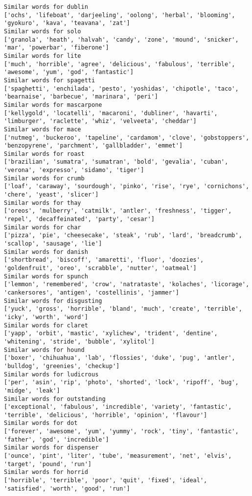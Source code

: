 \documentclass[11pt]{article}
\begin{document}
\begin{Verbatim}[commandchars=\\\{\}]
Similar words for dublin
['ochs', 'lifeboat', 'darjeeling', 'oolong', 'herbal', 'blooming', 'gyokuro', 'kava', 'teavana', 'zat']
Similar words for solo
['granola', 'heath', 'halvah', 'candy', 'zone', 'mound', 'snicker', 'mar', 'powerbar', 'fiberone']
Similar words for lite
['much', 'horrible', 'agree', 'delicious', 'fabulous', 'terrible', 'awesome', 'yum', 'god', 'fantastic']
Similar words for spagetti
['spaghetti', 'enchilada', 'pesto', 'yoshidas', 'chipotle', 'taco', 'bearnaise', 'barbecue', 'marinara', 'peri']
Similar words for mascarpone
['kellygold', 'locatelli', 'macaroni', 'dubliner', 'havarti', 'limburger', 'raclette', 'whiz', 'velveeta', 'cheddar']
Similar words for mace
['nutmeg', 'buckeroo', 'tapeline', 'cardamom', 'clove', 'gobstoppers', 'benzopyrene', 'parchment', 'gallbladder', 'emmet']
Similar words for roast
['brazilian', 'sumatra', 'sumatran', 'bold', 'gevalia', 'cuban', 'verona', 'expresso', 'sidamo', 'tiger']
Similar words for crumb
['loaf', 'caraway', 'sourdough', 'pinko', 'rise', 'rye', 'cornichons', 'chere', 'yeast', 'slicer']
Similar words for thay
['oreos', 'mulberry', 'catmilk', 'antler', 'freshness', 'tigger', 'repel', 'decaffeinated', 'party', 'cesar']
Similar words for char
['pizza', 'pie', 'cheesecake', 'steak', 'rub', 'lard', 'breadcrumb', 'scallop', 'sausage', 'lie']
Similar words for danish
['shortbread', 'biscoff', 'amaretti', 'fluor', 'doozies', 'goldenfruit', 'oreo', 'scrabble', 'nutter', 'oatmeal']
Similar words for spunch
['lemmon', 'remembered', 'crow', 'natrataste', 'kolaches', 'licorage', 'cankersores', 'antigen', 'costellinis', 'jammer']
Similar words for disgusting
['yuck', 'gross', 'horrible', 'bland', 'much', 'create', 'terrible', 'icky', 'worth', 'word']
Similar words for claret
['yapp', 'orbit', 'mastic', 'xylichew', 'trident', 'dentine', 'whitening', 'stride', 'bubble', 'xylitol']
Similar words for hound
['boxer', 'chihuahua', 'lab', 'flossies', 'duke', 'pug', 'antler', 'bulldog', 'greenies', 'checkup']
Similar words for ludicrous
['per', 'asin', 'rip', 'photo', 'shorted', 'lock', 'ripoff', 'bug', 'midge', 'leak']
Similar words for outstanding
['exceptional', 'fabulous', 'incredible', 'variety', 'fantastic', 'terrible', 'delicious', 'horrible', 'opinion', 'flavour']
Similar words for dot
['forever', 'awesome', 'yum', 'yummy', 'rock', 'tiny', 'fantastic', 'father', 'god', 'incredible']
Similar words for dispenser
['ounce', 'pint', 'liter', 'tube', 'measurement', 'net', 'elvis', 'target', 'pound', 'run']
Similar words for horrid
['horrible', 'terrible', 'poor', 'quit', 'fixed', 'ideal', 'satisfied', 'worth', 'good', 'run']

\end{Verbatim}
\end{document}

